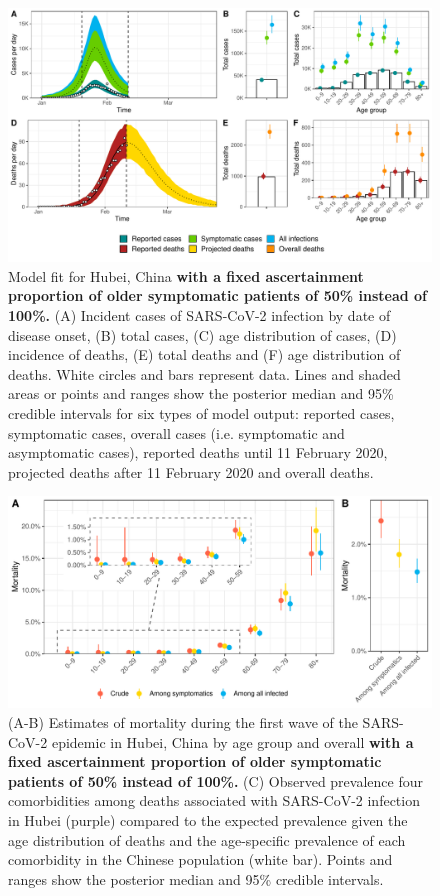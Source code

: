 \documentclass{article}
\begin{document}
	\begin{figure}[H]
		\includegraphics[width=\linewidth]{../format_output/figures/modelfit_china_rho50.pdf}
		\caption{Model fit for Hubei, China \textbf{with a fixed ascertainment proportion of older symptomatic patients of 50\% instead of 100\%.} (A) Incident cases of SARS-CoV-2 infection by date of disease onset, (B) total cases, (C) age distribution of cases, (D) incidence of deaths, (E) total deaths and (F) age distribution of deaths. White circles and bars represent data. Lines and shaded areas or points and ranges show the posterior median and 95\% credible intervals for six types of model output: reported cases, symptomatic cases, overall cases (i.e. symptomatic and asymptomatic cases), reported deaths until 11 February 2020, projected deaths after 11 February 2020 and overall deaths.}
		\label{fig:fit_sst1}
	\end{figure}

\begin{figure}[H]
	\centering
	\includegraphics[width=.8\linewidth]{../format_output/figures/cfr_china_rho50.pdf}
	\caption{(A-B) Estimates of mortality during the first wave of the SARS-CoV-2 epidemic in Hubei, China by age group and overall \textbf{with a fixed ascertainment proportion of older symptomatic patients of 50\% instead of 100\%.} (C) Observed prevalence four comorbidities among deaths associated with SARS-CoV-2 infection in Hubei (purple) compared to the expected prevalence given the age distribution of deaths and the age-specific prevalence of each comorbidity in the Chinese population (white bar). Points and ranges show the posterior median and 95\% credible intervals.}
	\label{fig:mortality_sst1}
\end{figure}
\end{document}
